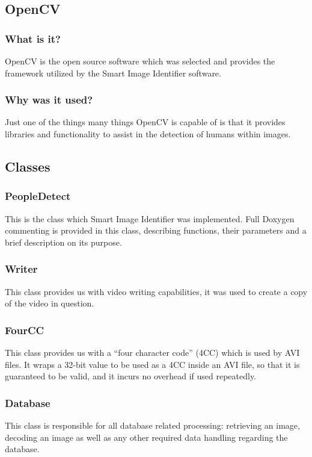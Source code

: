 \documentclass[a4paper,12pt]{report}
\begin{document}
	\subsection{OpenCV}
	\subsubsection{What is it?}
	OpenCV is the open source software which was selected and provides the framework
	utilized by the Smart Image Identifier software.
	\subsubsection{Why was it used?}
	Just one of the things many things OpenCV is capable of is that it provides libraries and
	functionality to assist in the detection of humans within images.

	\subsection{Classes}
	\subsubsection{PeopleDetect}
	This is the class which Smart Image Identifier was implemented.
	Full Doxygen commenting is provided in this class, describing functions, their parameters
	and a brief description on its purpose.
	\subsubsection{Writer}
This class provides us with video writing capabilities, it was used to create a copy of the
video in question.
\subsubsection{FourCC}
This class provides us with a “four character code” (4CC) which is used by AVI files.
It wraps a 32-bit value to be used as a 4CC inside an AVI file, so that it is guaranteed to be
valid, and it incurs no overhead if used repeatedly.

\subsubsection{Database}
This class is responsible for all database related processing: retrieving an image, decoding an image as well as any other required data handling regarding the database.
\end{document}
